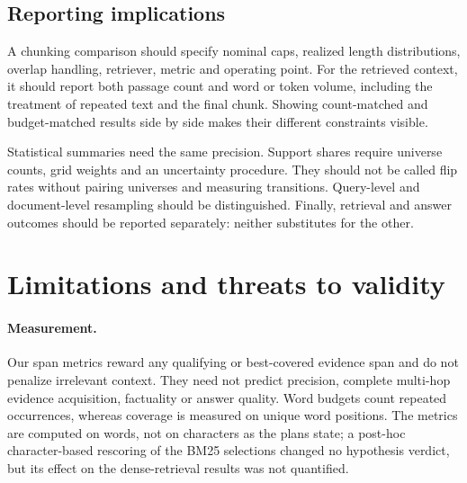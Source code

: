 \documentclass[11pt]{article}
\begin{document}
\subsection{Reporting implications}
A chunking comparison should specify nominal caps, realized length distributions, overlap handling, retriever, metric and operating point. For the retrieved context, it should report both passage count and word or token volume, including the treatment of repeated text and the final chunk. Showing count-matched and budget-matched results side by side makes their different constraints visible.

Statistical summaries need the same precision. Support shares require universe counts, grid weights and an uncertainty procedure. They should not be called flip rates without pairing universes and measuring transitions. Query-level and document-level resampling should be distinguished. Finally, retrieval and answer outcomes should be reported separately: neither substitutes for the other.

\section{Limitations and threats to validity}\label{sec:limitations}
\paragraph{Measurement.}
Our span metrics reward any qualifying or best-covered evidence span and do not penalize irrelevant context. They need not predict precision, complete multi-hop evidence acquisition, factuality or answer quality. Word budgets count repeated occurrences, whereas coverage is measured on unique word positions. The metrics are computed on words, not on characters as the plans state; a post-hoc character-based rescoring of the BM25 selections changed no hypothesis verdict, but its effect on the dense-retrieval results was not quantified.
\end{document}
